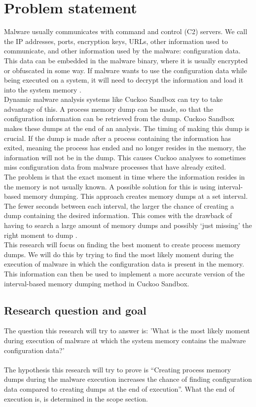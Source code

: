 \documentclass[conference]{IEEEtran}
\begin{document}
\section{Problem statement}

Malware usually communicates with command and control (C2) servers. We call the IP addresses, ports, encryption keys, URLs,   other information used to communicate, and other information used by the malware: configuration data. This data can be embedded in the malware binary, where it is usually encrypted or obfuscated in some way. If malware wants to use the configuration data while being executed on a system, it will need to decrypt the information and load it into the system memory \cite{wyke-confextract}.\\

Dynamic malware analysis systems like Cuckoo Sandbox \cite{cuckoo} can try to take advantage of this. A process memory dump can be made, so that the configuration information can be retrieved from the dump. Cuckoo Sandbox makes these dumps at the end of an analysis. The timing of making this dump is crucial. If the dump is made after a process containing the information has exited, meaning the process has ended and no longer resides in the memory, the information will not be in the dump. This causes Cuckoo analyses to sometimes miss configuration data from malware processes that have already exited.\\

The problem is that the exact moment in time where the information resides in the memory is not usually known. A possible solution for this is using interval-based memory dumping. This approach creates memory dumps at a set interval. The fewer seconds between each interval, the larger the chance of creating a dump containing the desired information. This comes with the drawback of having to search a large amount of memory dumps and possibly ‘just missing’ the right moment to dump \cite{teller-memory}.\\

This research will focus on finding the best moment to create process memory dumps. We will do this by trying to find the most likely moment during the execution of malware in which the configuration data is present in the memory. This information can then be used to implement a more accurate version of the interval-based memory dumping method in Cuckoo Sandbox.\\


\subsection{Research question and goal}
The question this research will try to answer is: 'What is the most likely moment during execution of malware at which the system memory contains the malware configuration data?'\\
\\The hypothesis this research will try to prove is “Creating process memory dumps during the malware execution increases the chance of finding configuration data compared to creating dumps at the end of execution”. What the end of execution is, is determined in the scope section.
\end{document}
